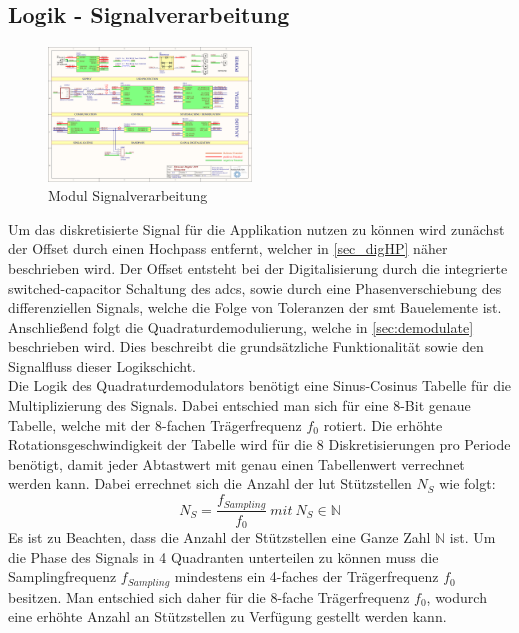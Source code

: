 \subsection{Logik - Signalverarbeitung}
\begin{figure}[h!]
	\centering
	\includegraphics[page=11,width=0.48\textwidth, trim=169mm 96mm 66mm 74mm, clip=true]{images/pcb/new.PDF}%
	\caption{Modul Signalverarbeitung}
	\label{fig:layer_demod}
\end{figure}
Um das diskretisierte Signal für die Applikation nutzen zu können wird zunächst der Offset durch einen Hochpass entfernt, welcher in \autoref{sec_digHP} näher beschrieben wird. Der Offset entsteht bei der Digitalisierung durch die integrierte switched-capacitor Schaltung des \ac{adc}s, sowie durch eine Phasenverschiebung des differenziellen Signals, welche die Folge von Toleranzen der \ac{smt} Bauelemente ist. Anschließend folgt die Quadraturdemodulierung, welche in \autoref{sec:demodulate} beschrieben wird. Dies beschreibt die grundsätzliche Funktionalität sowie den Signalfluss dieser Logikschicht.\\
Die Logik des Quadraturdemodulators benötigt eine Sinus-Cosinus Tabelle für die Multiplizierung des Signals. Dabei entschied man sich für eine 8-Bit genaue Tabelle, welche mit der 8-fachen Trägerfrequenz $f_0$ rotiert. Die erhöhte Rotationsgeschwindigkeit der Tabelle wird für die 8 Diskretisierungen pro Periode benötigt, damit jeder Abtastwert mit genau einen Tabellenwert verrechnet werden kann. Dabei errechnet sich die Anzahl der \ac{lut} Stützstellen $N_S$ wie folgt:
\begin{equation}
N_S=\frac{f_{Sampling}}{f_0}\ mit\ N_S\in\mathbb{N}
\end{equation}
Es ist zu Beachten, dass die Anzahl der Stützstellen eine Ganze Zahl $\mathbb{N}$ ist. Um die Phase des Signals in 4 Quadranten unterteilen zu können muss die Samplingfrequenz \(f_{Sampling}\) mindestens ein 4-faches der Trägerfrequenz $f_0$ besitzen. Man entschied sich daher für die 8-fache Trägerfrequenz $f_0$, wodurch eine erhöhte Anzahl an Stützstellen zu Verfügung gestellt werden kann.\\
